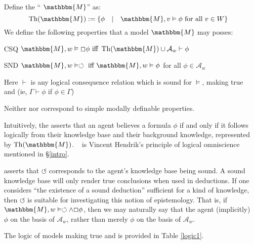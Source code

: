 \begin{definition}
  Define the `` $\mathbbm{M}$'' as:
  \[ \tmop{Th} (\mathbbm{M}) \assign \{\phi \hspace{1em} | \hspace{1em}
     \mathbbm{M}, v \vDash \phi \text{ for all } v \in W\} \]
  We define the following properties that a model $\mathbbm{M}$ may posses:
  
  \begin{descriptiondash}
    \item[CSQ] $\mathbbm{M}, w \vDash \Box \phi \text{ iff } \tmop{Th}
    (\mathbbm{M}) \cup \mathcal{A}_w \vdash \phi$
    
    \item[SND] $\mathbbm{M}, w \vDash \circlearrowleft \text{ iff }
    \mathbbm{M}, w \vDash \phi$ for all $\phi \in \mathcal{A}_w$
  \end{descriptiondash}
  
  Here $\vdash$ is any logical consequence relation which is sound for
  $\vDash$, making true  and  (ie,
  $\Gamma \vdash \phi$ if $\phi \in \Gamma$)
\end{definition}

Neither  nor  correspond to simple modally
definable properties.



Intuitively, the  asserts that an agent believes a formula
$\phi$ if and only if it follows logically from their knowledge base and their
background knowledge, represented by $\tmop{Th} (\mathbbm{M})$. \
 is Vincent Hendrik's principle of logical omniscience mentioned
in {\S}\ref{intro}.



 asserts that $\circlearrowleft$ corresponds to the agent's
knowledge base being sound. A sound knowledge base will only render true
conclusions when used in deductions.  If one considers ``the existence of a
sound deduction'' sufficient for a kind of knowledge, then $\circlearrowleft$
is suitable for investigating this notion of epistemology.  That is, if
$\mathbbm{M}, w \vDash \circlearrowleft \wedge \Box \phi$, then we may
naturally say that the agent (implicitly) {\tmem{knows}} $\phi$ on the basis
of $\mathcal{A}_w$, rather than merely {\tmem{believing}} $\phi$ on the basis
of $\mathcal{A}_w$.



The logic of models making true  and  is provided
in Table \ref{logic1}.

